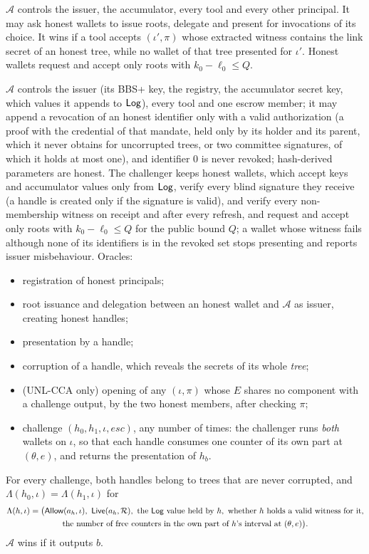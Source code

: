 \begin{definition}[INV]\label{def:inv}

$\mathcal{A}$ controls the issuer, the accumulator, every tool and every other principal. It may ask honest wallets to issue roots, delegate and present for invocations of its choice. It wins if a tool accepts $(\iota',\pi)$ whose extracted witness contains the link secret of an honest tree, while no wallet of that tree presented for $\iota'$. Honest wallets request and accept only roots with $k_0-\ell_0\le Q$.
\end{definition}

\begin{definition}[UNL]\label{def:unl}
$\mathcal{A}$ controls the issuer (its BBS+ key, the registry, the accumulator secret key, which values it appends to $\mathsf{Log}$), every tool and one escrow member; it may append a revocation of an honest identifier only with a valid authorization (a proof with the credential of that mandate, held only by its holder and its parent, which it never obtains for uncorrupted trees, or two committee signatures, of which it holds at most one), and identifier $0$ is never revoked; hash-derived parameters are honest. The challenger keeps honest wallets, which accept keys and accumulator values only from $\mathsf{Log}$, verify every blind signature they receive (a handle is created only if the signature is valid), and verify every non-membership witness on receipt and after every refresh, and request and accept only roots with $k_0-\ell_0\le Q$ for the public bound $Q$; a wallet whose witness fails although none of its identifiers is in the revoked set stops presenting and reports issuer misbehaviour. Oracles:
\begin{itemize}[leftmargin=*]
\item registration of honest principals;
\item root issuance and delegation between an honest wallet and $\mathcal{A}$ as issuer, creating honest handles;
\item presentation by a handle;
\item corruption of a handle, which reveals the secrets of its whole \emph{tree};
\item (UNL-CCA only) opening of any $(\iota,\pi)$ whose $E$ shares no component with a challenge output, by the two honest members, after checking $\pi$;
\item challenge $(h_0,h_1,\iota,\mathit{esc})$, any number of times: the challenger runs \emph{both} wallets on $\iota$, so that each handle consumes one counter of its own part at $(\theta,e)$, and returns the presentation of $h_b$.
\end{itemize}
For every challenge, both handles belong to trees that are never corrupted, and $\Lambda(h_0,\iota)=\Lambda(h_1,\iota)$ for
\begin{multline*}
\Lambda(h,\iota)=\big(\mathsf{Allow}(a_h,\iota),\ \mathsf{Live}(a_h,\mathcal{R}),\ \text{the $\mathsf{Log}$ value held by }h,\ \text{whether $h$ holds a valid witness for it},\\ \text{the number of free counters in the own part of $h$'s interval at }(\theta,e)\big).
\end{multline*}
$\mathcal{A}$ wins if it outputs $b$.
\end{definition}
